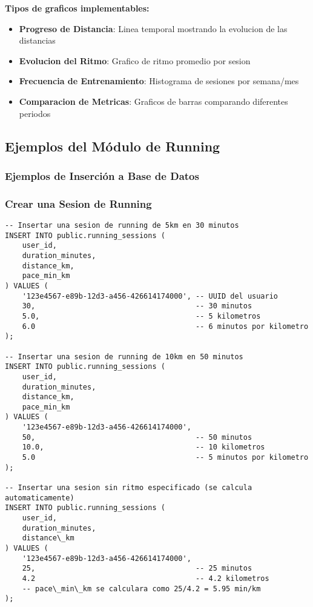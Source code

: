 \documentclass[12pt,a4paper]{article}
\begin{document}
\textbf{Tipos de graficos implementables:}
\begin{itemize}
    \item \textbf{Progreso de Distancia}: Linea temporal mostrando la evolucion de las distancias
    \item \textbf{Evolucion del Ritmo}: Grafico de ritmo promedio por sesion
    \item \textbf{Frecuencia de Entrenamiento}: Histograma de sesiones por semana/mes
    \item \textbf{Comparacion de Metricas}: Graficos de barras comparando diferentes periodos
\end{itemize}

\subsection{Ejemplos del Módulo de Running}

\subsubsection{Ejemplos de Inserción a Base de Datos}

\subsubsection{Crear una Sesion de Running}

\begin{lstlisting}[caption=Ejemplo de insercion en \texttt{running\_sessions}]
-- Insertar una sesion de running de 5km en 30 minutos
INSERT INTO public.running_sessions (
    user_id,
    duration_minutes,
    distance_km,
    pace_min_km
) VALUES (
    '123e4567-e89b-12d3-a456-426614174000', -- UUID del usuario
    30,                                     -- 30 minutos
    5.0,                                    -- 5 kilometros
    6.0                                     -- 6 minutos por kilometro
);

-- Insertar una sesion de running de 10km en 50 minutos
INSERT INTO public.running_sessions (
    user_id,
    duration_minutes,
    distance_km,
    pace_min_km
) VALUES (
    '123e4567-e89b-12d3-a456-426614174000',
    50,                                     -- 50 minutos
    10.0,                                   -- 10 kilometros
    5.0                                     -- 5 minutos por kilometro
);

-- Insertar una sesion sin ritmo especificado (se calcula automaticamente)
INSERT INTO public.running_sessions (
    user_id,
    duration_minutes,
    distance\_km
) VALUES (
    '123e4567-e89b-12d3-a456-426614174000',
    25,                                     -- 25 minutos
    4.2                                     -- 4.2 kilometros
    -- pace\_min\_km se calculara como 25/4.2 = 5.95 min/km
);
\end{lstlisting}
\end{document}
